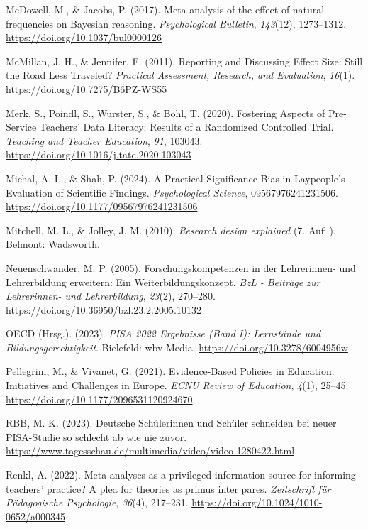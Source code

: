 \documentclass[
  jou,
  floatsintext,
  longtable,
  nolmodern,
  notxfonts,
  notimes,
  colorlinks=true,linkcolor=blue,citecolor=blue,urlcolor=blue]{apa7}
\newlength{\cslhangindent}
\newenvironment{CSLReferences}[2] %
 {\begin{list}{}{%
  \setlength{\itemindent}{0pt}
  \setlength{\leftmargin}{0pt}
  \setlength{\parsep}{0pt}
  \ifodd #1
   \setlength{\leftmargin}{\cslhangindent}
   \setlength{\itemindent}{-1\cslhangindent}
  \fi
  \setlength{\itemsep}{#2\baselineskip}}}
 {\end{list}}
\begin{document}
\begin{CSLReferences}{1}{0}
McDowell, M., \& Jacobs, P. (2017). Meta-analysis of the effect of
natural frequencies on Bayesian reasoning. \emph{Psychological
Bulletin}, \emph{143}(12), 1273--1312.
\url{https://doi.org/10.1037/bul0000126}

McMillan, J. H., \& Jennifer, F. (2011). Reporting and {Discussing
Effect Size}: {Still} the {Road Less Traveled}? \emph{Practical
Assessment, Research, and Evaluation}, \emph{16}(1).
\url{https://doi.org/10.7275/B6PZ-WS55}

Merk, S., Poindl, S., Wurster, S., \& Bohl, T. (2020). Fostering Aspects
of Pre-Service Teachers' Data Literacy: {Results} of a Randomized
Controlled Trial. \emph{Teaching and Teacher Education}, \emph{91},
103043. \url{https://doi.org/10.1016/j.tate.2020.103043}

Michal, A. L., \& Shah, P. (2024). A Practical Significance Bias in
Laypeople{'}s Evaluation of Scientific Findings. \emph{Psychological
Science}, 09567976241231506.
\url{https://doi.org/10.1177/09567976241231506}

Mitchell, M. L., \& Jolley, J. M. (2010). \emph{Research design
explained} (7. Aufl.). Belmont: Wadsworth.

Neuenschwander, M. P. (2005). Forschungskompetenzen in der Lehrerinnen-
und Lehrerbildung erweitern: Ein Weiterbildungskonzept. \emph{BzL -
Beiträge zur Lehrerinnen- und Lehrerbildung}, \emph{23}(2), 270--280.
\url{https://doi.org/10.36950/bzl.23.2.2005.10132}

OECD (Hrsg.). (2023). \emph{PISA 2022 Ergebnisse (Band I): Lernstände
und Bildungsgerechtigkeit}. Bielefeld: wbv Media.
\url{https://doi.org/10.3278/6004956w}

Pellegrini, M., \& Vivanet, G. (2021). Evidence-Based Policies in
Education: Initiatives and Challenges in Europe. \emph{ECNU Review of
Education}, \emph{4}(1), 25--45.
\url{https://doi.org/10.1177/2096531120924670}

RBB, M. K. (2023). Deutsche Schülerinnen und Schüler schneiden bei neuer
PISA-Studie so schlecht ab wie nie zuvor.
\url{https://www.tagesschau.de/multimedia/video/video-1280422.html}

Renkl, A. (2022). Meta-analyses as a privileged information source for
informing teachers' practice? A plea for theories as primus inter pares.
\emph{Zeitschrift für Pädagogische Psychologie}, \emph{36}(4), 217--231.
\url{https://doi.org/10.1024/1010-0652/a000345}


\end{CSLReferences}
\end{document}
